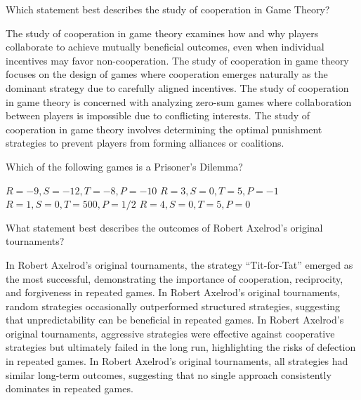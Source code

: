 \documentclass{exam}
\begin{document}
\begin{questions}
        
    \question
    Which statement best describes the study of cooperation in Game Theory?

    \begin{checkboxes}
        \choice The study of cooperation in game theory examines how and why players collaborate to achieve mutually beneficial outcomes, even when individual incentives may favor non-cooperation.
        \choice The study of cooperation in game theory focuses on the design of games where cooperation emerges naturally as the dominant strategy due to carefully aligned incentives.            
        \choice The study of cooperation in game theory is concerned with analyzing zero-sum games where collaboration between players is impossible due to conflicting interests.
        \choice The study of cooperation in game theory involves determining the optimal punishment strategies to prevent players from forming alliances or coalitions.
    \end{checkboxes}

    \question
    Which of the following games is a Prisoner's Dilemma?

    \begin{checkboxes}
        \choice \(R=-9, S=-12, T=-8, P=-10\)
        \choice \(R=3, S=0, T=5, P=-1\)
        \choice \(R=1, S=0, T=500, P=1/2\)
        \choice \(R=4, S=0, T=5, P=0\)
    \end{checkboxes}

    \question What statement best describes the outcomes of Robert Axelrod's
    original tournaments?

    \begin{checkboxes}
        \choice In Robert Axelrod's original tournaments, the strategy ``Tit-for-Tat'' emerged as the most successful, demonstrating the importance of cooperation, reciprocity, and forgiveness in repeated games.
        \choice In Robert Axelrod's original tournaments, random strategies occasionally outperformed structured strategies, suggesting that unpredictability can be beneficial in repeated games.
        \choice In Robert Axelrod's original tournaments, aggressive strategies were effective against cooperative strategies but ultimately failed in the long run, highlighting the risks of defection in repeated games.
        \choice In Robert Axelrod's original tournaments, all strategies had similar long-term outcomes, suggesting that no single approach consistently dominates in repeated games.
    \end{checkboxes}

\end{questions}
\end{document}
